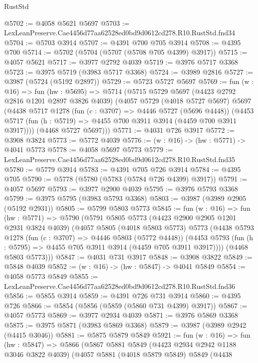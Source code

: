 \begin{lexlean}{RustStd}
\begin{coremodule}
@5702 := @4058 @5621 @5697
@5703 := LexLeanPreserve.Cae4456d77aa62528ed0bd9d0612cd278.R10.RustStd.fnd34
@5704 := @5703 @3914
@5707 := @4391 @700 @705 @3914
@5708 := @4395 @700
@5714 := @5702 (@5704 (@5707 (@5708 @705 @4399) @3917))
@5715 := @4057 @5621
@5717 := @3977 @2792 @4039
@5719 := @3976 @5717 @3368
@5723 := @3975 @5719 (@3983 @5717 @3368)
@5724 := @3989 @2816
@5727 := @3987 (@5724 (@5192 @2897))
@5729 := @5723 @5727 @5697
@5769 := fun (w : @16) =>
  fun (hw : @5695) =>
  @5714
    (@5715
      @5729
      @5697
      (@4423 @2792 @2816 @1201 @2897 @3826 @4039)
      (@4057
        @5729
        (@4018 @5727 @5697)
        @5697
        (@4438
          @5717
          @1278
          (fun (c : @3707) => @4446 @5727 (@5696 @4448))
          (@4453 @5717 (fun (h : @5719) => @4455 @700 @3911 @3914 (@4459 @700 @3911 @3917))))
        (@4468 @5727 @5697)))
@5771 := @4031 @726 @3917
@5772 := @3908 @3824
@5773 := @5772 @4039
@5776 := (w : @16) -> (hw : @5771) -> @4041 @5773
@5778 := @4058 @5697 @5773
@5779 := LexLeanPreserve.Cae4456d77aa62528ed0bd9d0612cd278.R10.RustStd.fnd35
@5780 := @5779 @3914
@5783 := @4391 @705 @726 @3914
@5784 := @4395 @705
@5790 := @5778 (@5780 (@5783 (@5784 @726 @4399) @3917))
@5791 := @4057 @5697
@5793 := @3977 @2900 @4039
@5795 := @3976 @5793 @3368
@5799 := @3975 @5795 (@3983 @5793 @3368)
@5803 := @3987 (@3989 @2905 (@5192 @2931))
@5805 := @5799 @5803 @5773
@5845 := fun (w : @16) =>
  fun (hw : @5771) =>
  @5790
    (@5791
      @5805
      @5773
      (@4423 @2900 @2905 @1201 @2931 @3824 @4039)
      (@4057
        @5805
        (@4018 @5803 @5773)
        @5773
        (@4438
          @5793
          @1278
          (fun (c : @3707) => @4446 @5803 (@5772 @4448))
          (@4453 @5793 (fun (h : @5795) => @4455 @705 @3911 @3914 (@4459 @705 @3911 @3917))))
        (@4468 @5803 @5773)))
@5847 := @4031 @731 @3917
@5848 := @3908 @3822
@5849 := @5848 @4039
@5852 := (w : @16) -> (hw : @5847) -> @4041 @5849
@5854 := @4058 @5773 @5849
@5855 := LexLeanPreserve.Cae4456d77aa62528ed0bd9d0612cd278.R10.RustStd.fnd36
@5856 := @5855 @3914
@5859 := @4391 @726 @731 @3914
@5860 := @4395 @726
@5866 := @5854 (@5856 (@5859 (@5860 @731 @4399) @3917))
@5867 := @4057 @5773
@5869 := @3977 @2934 @4039
@5871 := @3976 @5869 @3368
@5875 := @3975 @5871 (@3983 @5869 @3368)
@5879 := @3987 (@3989 @2942 (@4415 @3046))
@5881 := @5875 @5879 @5849
@5921 := fun (w : @16) =>
  fun (hw : @5847) =>
  @5866
    (@5867
      @5881
      @5849
      (@4423 @2934 @2942 @1188 @3046 @3822 @4039)
      (@4057
        @5881
        (@4018 @5879 @5849)
        @5849
        (@4438

\end{coremodule}
\end{lexlean}
